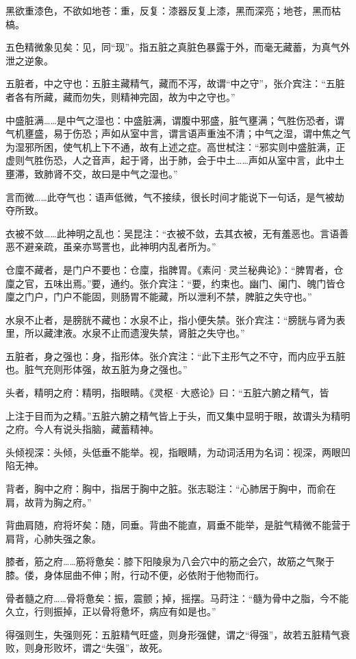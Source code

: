 \documentclass[12pt]{ctexbook}
\begin{document}
\begin{jiaozhu}
	\item 黑欲重漆色，不欲如地苍：重，反复：漆器反复上漆，黑而深亮；地苍，黑而枯槁。
	\item 五色精微象见矣：见，同“现”。指五脏之真脏色暴露于外，而毫无藏蓄，为真气外泄之逆象。
	\item 五脏者，中之守也：五脏主藏精气，藏而不泻，故谓“中之守”，张介宾注：“五脏者各有所藏，藏而勿失，则精神完固，故为中之守也。”
	\item 中盛脏满……是中气之湿也：中盛脏满，谓腹中邪盛，脏气壅满；气胜伤恐者，谓气机壅盛，易于伤恐；声如从室中言，谓言语声重浊不清；中气之湿，谓中焦之气为湿邪所困，使气机上下不通，故有上述之症。高世栻注：“邪实则中盛脏满，正虚则气胜伤恐，人之音声，起于肾，出于肺，会于中土……声如从室中言，此中土壅滞，致肺肾不交，故曰是中气之湿也。”
	\item 言而微……此夺气也：语声低微，气不接续，很长时间才能说下一句话，是气被劫夺所致。
	\item 衣被不敛……此神明之乱也：吴昆注：“衣被不敛，去其衣被，无有羞恶也。言语善恶不避亲疏，虽亲亦骂詈也，此神明内乱者所为。”
	\item 仓廩不藏者，是门户不要也：仓廩，指脾胃。《素问·灵兰秘典论》：“脾胃者，仓廩之官，五味出焉。”要，通约。张介宾注：“要，约束也。幽门、阑门、魄门皆仓廩之门户，门户不能固，则肠胃不能藏，所以泄利不禁，脾脏之失守也。”
	\item 水泉不止者，是膀胱不藏也：水泉不止，指小便失禁。张介宾注：“膀胱与肾为表里，所以藏津液。水泉不止而遗溲失禁，肾脏之失守也。”
	\item 五脏者，身之强也：身，指形体。张介宾注：“此下主形气之不守，而内应乎五脏也。脏气充则形体强，故五脏为身之强也。”
	\item 头者，精明之府：精明，指眼睛。《灵枢·大惑论》曰：“五脏六腑之精气，皆
	\item 上注于目而为之精。”五脏六腑之精气皆上于头，而又集中显明于眼，故谓头为精明之府。今人有说头指脑，藏蓄精神。
	\item 头倾视深：头倾，头低垂不能举。视，指眼睛，为动词活用为名词：视深，两眼凹陷无神。
	\item 背者，胸中之府：胸中，指居于胸中之脏。张志聪注：“心肺居于胸中，而俞在肩，故背为胸之府。”
	\item 背曲肩随，府将坏矣：随，同垂。背曲不能直，肩垂不能举，是脏气精微不能营于肩背，心肺失强之象。
	\item 膝者，筋之府……筋将惫矣：膝下阳陵泉为八会穴中的筋之会穴，故筋之气聚于膝。偻，身体屈曲不伸；附，行动不便，必依附于他物而行。
	\item 骨者髓之府……骨将惫矣：振，震颤；掉，摇摆。马莳注：“髓为骨中之脂，今不能久立，行则振掉，正以骨将惫坏，病应有如是也。”
	\item 得强则生，失强则死：五脏精气旺盛，则身形强健，谓之“得强”，故若五脏精气衰败，则身形败坏，谓之“失强”，故死。
\end{jiaozhu}
\end{document}
